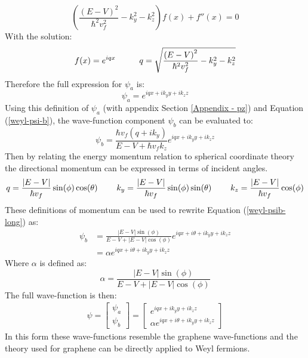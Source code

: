 			\begin{equation}
				\left(\frac{\left(E-V\right)^{2}}{\hbar^{2}v_{f}^{2}}-k_{y}^{2}-k_{z}^{2}\right)f(x)+f''(x)=0
			\end{equation}
			With the solution:
			\begin{equation}
				f(x)=e^{iqx}\hspace{1 cm}q=\sqrt{\frac{\left(E-V\right)^{2}}{\hbar^{2}v_{f}^{2}}-k_{y}^{2}-k_{z}^{2}}
			\end{equation}
			Therefore the full expression for $\psi_{a}$ is:
			\begin{equation}
				\psi_{a}=e^{iqx+ik_{y}y+ik_{z}z}
			\end{equation}
			Using this definition of $\psi_{a}$ (with appendix Section \ref{Appendix - pz}) and Equation (\ref{weyl-psi-b}), the wave-function component $\psi_{b}$ can be evaluated to:
			\begin{equation}
				\psi_{b}= \frac{\hbar v_{f}\left(q+ik_{y}\right)}{E-V+\hbar v_{f}k_{z}}e^{iqx+ik_{y}y+ik_{z}z}
				\label{weyl-psib-long}
			\end{equation}
			Then by relating the energy momentum relation to spherical coordinate theory the directional momentum can be expressed in terms of incident angles.
			\begin{equation}
				q=\frac{|E-V|}{\hbar v_{f}}\sin(\phi)\cos(\theta)
				\hspace{0.8 cm}
				k_{y}=\frac{|E-V|}{\hbar v_{f}}\sin(\phi)\sin(\theta)
				\hspace{0.8 cm}
				k_{z}=\frac{|E-V|}{\hbar v_{f}}\cos(\phi)
			\end{equation}
			These definitions of momentum can be used to rewrite Equation (\ref{weyl-psib-long}) as:
			\begin{align}
				\psi_{b}&=\frac{|E-V|\sin(\phi)}{E-V+|E-V|\cos(\phi)} e^{iqx+i\theta+ik_{y}y+ik_{z}z}
				\\
				&=\alpha  e^{iqx+i\theta+ik_{y}y+ik_{z}z}
			\end{align}
			Where $\alpha$ is defined as:
			\begin{equation}
				\alpha=\frac{|E-V|\sin(\phi)}{E-V+|E-V|\cos(\phi)}
			\end{equation}
			The full wave-function is then:
			\begin{align}
				\psi=
				\left[\begin{array}{ccc}
					\psi_a\\	
					\psi_b
				\end{array}\right]
				=
				\left[\begin{array}{ccc}
					e^{iqx+ik_{y}y+ik_{z}z}\\	
					\alpha  e^{iqx+i\theta+ik_{y}y+ik_{z}z}
				\end{array}\right]
			\end{align}
			In this form these wave-functions resemble the graphene wave-functions and the theory used for graphene can be directly applied to Weyl fermions.
